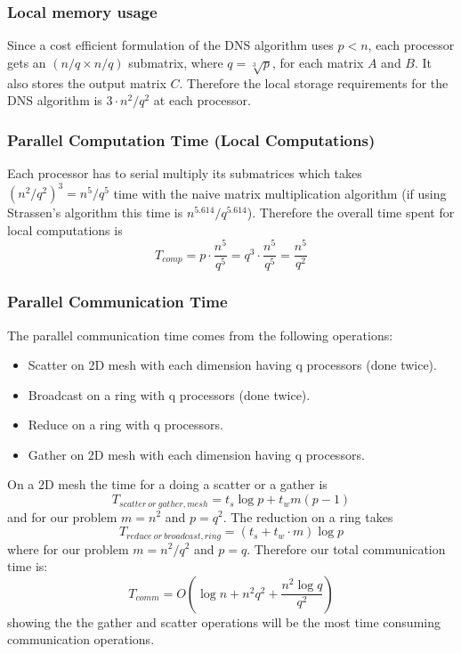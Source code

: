 \documentclass{article}
\begin{document}
\subsubsection{Local memory usage}

Since a cost efficient formulation of the DNS algorithm uses $p < n$, each
processor gets an $(n/q \times n/q)$ submatrix, where $q = \sqrt[3]{p}$, for
each matrix $A$ and $B$.  It also stores the output matrix $C$.  Therefore the
local storage requirements for the DNS algorithm is $3 \cdot n^2 / q^2$ at each
processor.

\subsubsection{Parallel Computation Time (Local Computations)}

Each processor has to serial multiply its submatrices which takes $(n^2/q^2)^3 =
n^5/q^5$ time with the naive matrix multiplication algorithm (if using
Strassen's algorithm this time is $n^{5.614}/q^{5.614}$).  Therefore the
overall time spent for local computations is $$T_{{comp}} = p\cdot
\frac{n^5}{q^5} = q^3 \cdot \frac{n^5}{q^5} = \frac{n^5}{q^2}$$

\subsubsection{Parallel Communication Time}

The parallel communication time comes from the following operations:
\begin{itemize}
  \item Scatter on 2D mesh with each dimension having q processors (done twice).
  \item Broadcast on a ring with q processors (done twice).
  \item Reduce on a ring with q processors.
  \item Gather on 2D mesh with each dimension having q processors.
\end{itemize}

On a 2D mesh the time for a doing a scatter or a gather is
$$T_{{scatter~or~gather},{mesh}} = t_s \log{p} + t_w  m (p-1)$$ and for our
problem $m = n^2$ and $p = q^2$.  The reduction on a ring takes
$$T_{{reduce~or~broadcast},{ring}} = (t_s + t_w\cdot m) \log{p} $$ where for our
problem $m = n^2 / q^2$ and $p = q$.  Therefore our total communication time is:
$$T_{{comm}} = O(\log{n} + n^2 q^2 + \frac{n^2 \log{q}}{q^2} )$$ showing the the
gather and scatter operations will be the most time consuming communication
operations.
\end{document}
